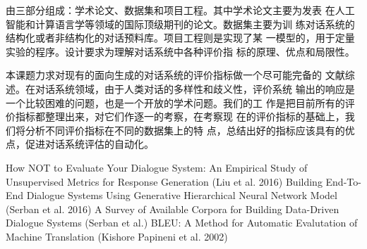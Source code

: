 
\assignReq
{由三部分组成：学术论文、数据集和项目工程。其中学术论文主要为发表}
{在人工智能和计算语言学等领域的国际顶级期刊的论文。数据集主要为训}
{练对话系统的结构化或者非结构化的对话预料库。项目工程则是实现了某}
{一模型的，用于定量实验的程序。设计要求为理解对话系统中各种评价指}
{标的原理、优点和局限性。}

\assignWork
{本课题力求对现有的面向生成的对话系统的评价指标做一个尽可能完备的}
{文献综述。在对话系统领域，由于人类对话的多样性和歧义性，评价系统}
{输出的响应是一个比较困难的问题，也是一个开放的学术问题。我们的工}
{作是把目前所有的评价指标都整理出来，对它们作逐一的考察，在考察现}
{在的评价指标的基础上，我们将分析不同评价指标在不同的数据集上的特}
{点，总结出好的指标应该具有的优点，促进对话系统评估的自动化。}

\assignRef
{How NOT to Evaluate Your Dialogue System: An Empirical Study of Unsupervised}
{Metrics for Response Generation (Liu et al. 2016)}
{Building End-To-End Dialogue Systems Using Generative Hierarchical Neural}
{Network Model (Serban et al. 2016)}
{A Survey of Available Corpora for Building Data-Driven Dialogue Systems}
{(Serban et al.)}
{BLEU: A Method for Automatic Evalutation of Machine Translation}
{(Kishore Papineni et al. 2002)}
